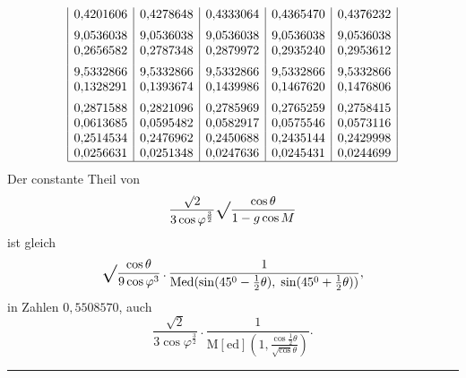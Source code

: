 \[\begin{array}{|r|r|r|r|r|}
0{,}4201606&0{,}4278648&0{,}4333064&0{,}4365470&0{,}4376232\\[5pt]
9{,}0536038&9{,}0536038&9{,}0536038&9{,}0536038&9{,}0536038\\
0{,}2656582&0{,}2787348&0{,}2879972&0{,}2935240&0{,}2953612\\[5pt]
9{,}5332866&9{,}5332866&9{,}5332866&9{,}5332866&9{,}5332866\\
0{,}1328291&0{,}1393674&0{,}1439986&0{,}1467620&0{,}1476806\\[5pt]
0{,}2871588&0{,}2821096&0{,}2785969&0{,}2765259&0{,}2758415\\
0{,}0613685&0{,}0595482&0{,}0582917&0{,}0575546&0{,}0573116\\
0{,}2514534&0{,}2476962&0{,}2450688&0{,}2435144&0{,}2429998\\
0{,}0256631&0{,}0251348&0{,}0247636&0{,}0245431&0{,}0244699\\\hline
\end{array}\]\endgroup
\clearpage{}
\noindent\hspace*{\parindent}Der constante Theil von
\[\frac{\surd2}{3\cos\varphi^{\frac32}}\vsroot{\frac{\cos\theta}{1-g\cos M}}\]
\noindent ist gleich
\[\vsroot{\frac{\cos\theta}{9\cos\varphi^3}}\,{.}\,\frac1{\operatorname{Med}(\sin(45^0-\tfrac12\theta),\;\sin(45^0+\tfrac12\theta))},\]
\noindent in Zahlen \(0{,}5508570\), auch
\begin{equation}\frac{\surd2}{3\cos\varphi^{\frac32}}\,{.}\,\frac1{\operatorname{M[ed]}\left(1,\frac{\cos\tfrac12\theta}{\surd\cos\theta}\right)}.\tag*{[29]}\end{equation}
\begin{center}\rule{.24\linewidth}{.4pt}\end{center}
\endgroup{}
